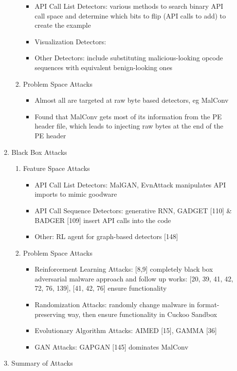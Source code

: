 \documentclass{article}
\begin{document}
\begin{enumerate}
\begin{enumerate}
\begin{enumerate}
\begin{itemize}
				\item API Call List Detectors: various methods to search binary API call space and determine which bits to flip (API calls to add) to create the example
				\item Visualization Detectors: 
				\item Other Detectors: include substituting malicious-looking opcode sequences with equivalent benign-looking ones
			\end{itemize}
			\item Problem Space Attacks
			\begin{itemize}
				\item Almost all are targeted at raw byte based detectors, eg MalConv
				\item Found that MalConv gets most of its information from the PE header file, which leads to injecting raw bytes at the end of the PE header
			\end{itemize}
		\end{enumerate}
		\item Black Box Attacks
		\begin{enumerate}
			\item Feature Space Attacks
			\begin{itemize}
				\item API Call List Detectors: MalGAN, EvnAttack manipulates API imports to mimic goodware
				\item API Call Sequence Detectors: generative RNN, GADGET [110] \& BADGER [109] insert API calls into the code
				\item Other: RL agent for graph-based detectors [148]
			\end{itemize}
			\item Problem Space Attacks
			\begin{itemize}
				\item Reinforcement Learning Attacks: [8,9] completely black box adversarial malware approach and follow up works: [20, 39, 41, 42, 72, 76, 139], [41, 42, 76] ensure functionality
				\item Randomization Attacks: randomly change malware in format-preserving way, then ensure functionality in Cuckoo Sandbox
				\item Evolutionary Algorithm Attacks: AIMED [15], GAMMA [36]
				\item GAN Attacks: GAPGAN [145] dominates MalConv
			\end{itemize}
		\end{enumerate}
		\item Summary of Attacks

\end{enumerate}
\end{enumerate}
\end{document}
